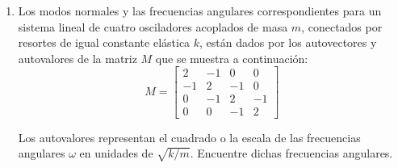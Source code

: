 \documentclass[12pt]{article}
\begin{document}
\begin{problemas}[]
\begin{enumerate}[leftmargin=*]
\item Los modos normales y las frecuencias angulares correspondientes 
para un sistema lineal de cuatro osciladores acoplados de masa $m$, 
conectados por resortes de igual constante elástica $k$, 
están dados por los autovectores y autovalores de la matriz $M$ 
que se muestra a continuación:
\begin{equation}
M = \begin{bmatrix} 
2 & -1 & 0 & 0 \\ 
-1 & 2 & -1 & 0 \\ 
0 & -1 & 2 & -1 \\ 
0 & 0 & -1 & 2 
\end{bmatrix} \nonumber
\end{equation}

Los autovalores representan el cuadrado o la escala de las frecuencias 
angulares $\omega$ en unidades de $\sqrt{k/m}$. 
Encuentre dichas frecuencias angulares.
\end{enumerate}
\end{problemas}
\end{document}
